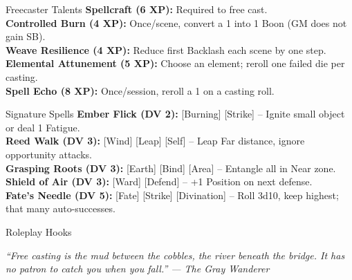 \documentclass[10pt]{article}
\begin{document}
\begin{minipage}[t]{0.48\linewidth}
    \begin{charbox}{Freecaster Talents}
        \textbf{Spellcraft (6 XP):} Required to free cast.\\
        \textbf{Controlled Burn (4 XP):} Once/scene, convert a 1 into 1 Boon (GM does not gain SB).\\
        \textbf{Weave Resilience (4 XP):} Reduce first Backlash each scene by one step.\\
        \textbf{Elemental Attunement (5 XP):} Choose an element; reroll one failed die per casting.\\
        \textbf{Spell Echo (8 XP):} Once/session, reroll a 1 on a casting roll.
    \end{charbox}
    
    \vspace{0.5em}
    
    \begin{charbox}{Signature Spells}
        \textbf{Ember Flick (DV 2):} [Burning] [Strike] -- Ignite small object or deal 1 Fatigue.\\
        \textbf{Reed Walk (DV 3):} [Wind] [Leap] [Self] -- Leap Far distance, ignore opportunity attacks.\\
        \textbf{Grasping Roots (DV 3):} [Earth] [Bind] [Area] -- Entangle all in Near zone.\\
        \textbf{Shield of Air (DV 3):} [Ward] [Defend] -- +1 Position on next defense.\\
        \textbf{Fate's Needle (DV 5):} [Fate] [Strike] [Divination] -- Roll 3d10, keep highest; that many auto-successes.
    \end{charbox}
    
    \vspace{0.5em}
    
    \begin{charbox}{Roleplay Hooks}
        \underline{\hspace{7cm}}\\
        \underline{\hspace{7cm}}
    \end{charbox}
\end{minipage}

\vspace{1em}
\begin{center}
    {\small\sffamily\itshape ``Free casting is the mud between the cobbles, the river beneath the bridge. It has no patron to catch you when you fall.'' --- The Gray Wanderer}
\end{center}
\end{document}
